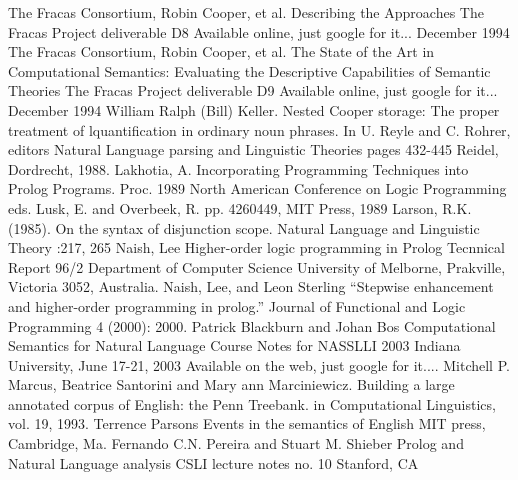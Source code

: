 \documentclass{book}[9pt]
\begin{document}
\begin{thebibliography}{1}
\newblock The Fracas Consortium, Robin Cooper, et al.
\newblock Describing the Approaches
\newblock The Fracas Project deliverable D8
\newblock Available online, just google for it...
\newblock December 1994
\newblock The Fracas Consortium, Robin Cooper, et al.
\newblock The State of the Art in Computational Semantics:
\newblock Evaluating the Descriptive Capabilities of Semantic Theories
\newblock The Fracas Project deliverable D9
\newblock Available online, just google for it...
\newblock December 1994
\newblock William Ralph (Bill) Keller.
\newblock Nested Cooper storage: The proper treatment of
lquantification in ordinary noun phrases.
\newblock In U. Reyle and C. Rohrer, editors
\newblock Natural Language parsing and Linguistic Theories
\newblock pages 432-445
\newblock Reidel, Dordrecht, 1988.
\newblock Lakhotia, A.
\newblock Incorporating Programming Techniques into Prolog Programs.
\newblock Proc. 1989 North American Conference on Logic Programming
\newblock eds. Lusk, E. and Overbeek, R.
\newblock pp. 4260449, MIT Press, 1989
\newblock Larson, R.K. (1985).  On the syntax of disjunction scope.
\newblock Natural Language and Linguistic Theory
:217, 265
\newblock Naish, Lee
\newblock Higher-order logic programming in Prolog
\newblock Tecnnical Report 96/2
\newblock Department of Computer Science
\newblock University of Melborne, Prakville, Victoria 3052, Australia.
\newblock Naish, Lee, and Leon Sterling
\newblock ``Stepwise enhancement and higher-order programming in prolog.'' 
\newblock Journal of Functional and Logic Programming 4 (2000): 2000.
\newblock Patrick Blackburn and Johan Bos
\newblock Computational Semantics for Natural Language
\newblock Course Notes for NASSLLI 2003
\newblock Indiana University, June 17-21, 2003
\newblock Available on the web, just google for it....
\newblock Mitchell P. Marcus,  Beatrice Santorini and Mary ann Marciniewicz.
\newblock Building a large annotated corpus of English: the Penn Treebank.
\newblock in Computational Linguistics, vol. 19, 1993.
\newblock Terrence Parsons
\newblock Events in the semantics of English
\newblock MIT press, Cambridge, Ma.
\newblock Fernando C.N. Pereira and Stuart M. Shieber
\newblock Prolog and Natural Language analysis
\newblock CSLI lecture notes no. 10
\newblock Stanford, CA
\end{thebibliography}
\end{document}
